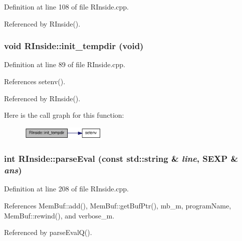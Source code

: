 Definition at line 108 of file RInside.cpp.

Referenced by RInside().\hypertarget{classRInside_ae045f7e3d8b0881e2af8cdfb5c5fc118}{
\subsubsection[{init\_\-tempdir}]{\setlength{\rightskip}{0pt plus 5cm}void RInside::init\_\-tempdir (void)}}
\label{classRInside_ae045f7e3d8b0881e2af8cdfb5c5fc118}


Definition at line 89 of file RInside.cpp.

References setenv().

Referenced by RInside().

Here is the call graph for this function:\nopagebreak
\begin{figure}[H]
\begin{center}
\leavevmode
\includegraphics[width=116pt]{classRInside_ae045f7e3d8b0881e2af8cdfb5c5fc118_cgraph}
\end{center}
\end{figure}
\hypertarget{classRInside_a4cf10e78fb73bfda699f921c28e6b985}{
\subsubsection[{parseEval}]{\setlength{\rightskip}{0pt plus 5cm}int RInside::parseEval (const std::string \& {\em line}, \/  SEXP \& {\em ans})}}
\label{classRInside_a4cf10e78fb73bfda699f921c28e6b985}


Definition at line 208 of file RInside.cpp.

References MemBuf::add(), MemBuf::getBufPtr(), mb\_\-m, programName, MemBuf::rewind(), and verbose\_\-m.

Referenced by parseEvalQ().

